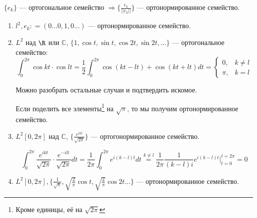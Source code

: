 \begin{remark}
    \(\{e_k\}\) --- ортогональное семейство \( \Rightarrow \{\frac{e_k}{||e_k||} \} \) --- ортонормированное семейство.
\end{remark}

\begin{example}\itemfix
    \begin{enumerate}
        \item \(l^2, e_k : = (0 \dots 0, 1, 0 \dots )\) --- ортонормированное семейство.
        \item \(L^2\) над \(\R\) или \(\mathbb{C}\), \(\{1, \cos t, \sin t, \cos 2t, \sin 2t, \dots \} \) --- ортогональное семейство:
              \[\int_0^{2\pi} \cos kt \cdot \cos lt = \frac{1}{2} \int_0^{2\pi} \cos(kt - lt) + \cos(kt + lt) dt = \begin{cases}
                      0,   & k \neq l \\
                      \pi, & k = l
                  \end{cases}\]

              Можно разобрать остальные случаи и подтвердить искомое.

              Если поделить все элементы\footnote{Кроме единицы, её на \(\sqrt{2\pi}\)} на \(\sqrt{\pi}\), то мы получим ортонормированное семейство.
        \item \(L^2[0, 2\pi]\) над \(\mathbb{C}\), \(\{\frac{e^{ikt}}{\sqrt{2\pi}} \} \) --- ортогонормированное семейство.

              \[\int_0^{2\pi} \frac{e^{ikt}}{\sqrt{2\pi}} \cdot \frac{e^{ - ilt}}{\sqrt{2\pi}} dt = \frac{1}{2\pi} \int_0^{2\pi} e^{i(k - l)t} dt \stackrel{k \neq l}{ =} \frac{1}{2\pi} \frac{1}{(k - l)i} e^{i(k - l)t}\Big|_{t = 0}^{t = 2\pi} = 0\]
        \item \(L^2[0, 2\pi], \{\frac{1}{\sqrt{\pi}}, \sqrt{\frac{2}{\pi}} \cos t, \sqrt{\frac{2}{\pi}} \cos 2t \dots \} \) --- ортонормированное семейство.
    \end{enumerate}
\end{example}

